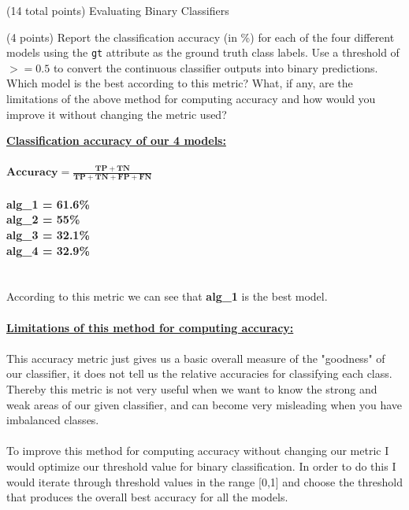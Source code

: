 \documentclass[12pt]{article}
\begin{document}
\clearpage


\begin{question}{(14 total points) Evaluating Binary Classifiers}





%
%
\begin{subquestion}{(4 points) Report the classification accuracy (in \%) for each of the four different models using the \texttt{gt} attribute as the ground truth class labels. 
Use a threshold of $>= 0.5$ to convert the continuous classifier outputs into binary predictions. 
Which model is the best according to this metric?
What, if any, are the limitations of the above method for computing accuracy and how would you improve it without changing the metric used?
}


\begin{answerbox}{32em}
\large{\textbf{\underline{Classification accuracy of our 4 models:}}}\\
\\
\normalsize{
$\mathbf{Accuracy = \frac{TP+TN}{TP+TN+FP+FN}}$\\
\\
\textbf{alg\_1 = 61.6\%}
\\
\textbf{alg\_2 = 55\%}
\\
\textbf{alg\_3 = 32.1\%}
\\
\textbf{alg\_4 = 32.9\%}
\\
\\
\\
According to this metric we can see that \textbf{alg\_1} is the best model.\\
\\
\textbf{\underline{Limitations of this method for computing accuracy:}}\\
\\
This accuracy metric just gives us a basic overall measure of the "goodness" of our classifier, it does not tell us the relative accuracies for classifying each class. Thereby this metric is not very useful when we want to know the strong and weak areas of our given classifier, and can become very misleading when you have imbalanced classes.\\
\\
To improve this method for computing accuracy without changing our metric I would optimize our threshold value for binary classification. In order to do this I would iterate through threshold values in the range [0,1] and choose the threshold that produces the overall best accuracy for all the models.
}
\end{answerbox}




\end{subquestion}
\end{question}
\end{document}
